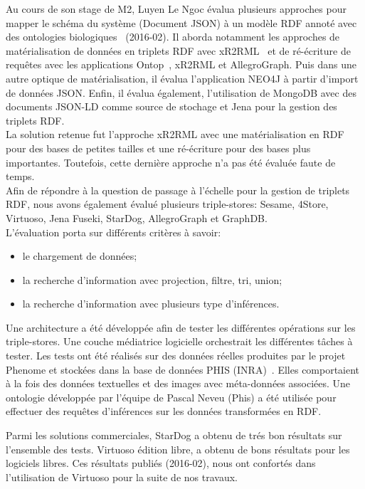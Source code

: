 Au cours de son stage de M2, Luyen Le Ngoc évalua plusieurs approches pour mapper le schéma du système (Document JSON) à un modèle RDF annoté avec des ontologies biologiques~\cite{Luyen:2016} (2016-02). Il aborda notamment les approches de matérialisation de données en triplets RDF avec xR2RML~\cite{Michel2015} et de ré-écriture de requêtes avec les applications Ontop~\cite{rodriguez2015}, xR2RML et AllegroGraph. Puis dans une autre optique de matérialisation, il évalua l'application NEO4J à partir d'import de données JSON. Enfin, il évalua également, l'utilisation de MongoDB avec des documents JSON-LD comme source de stochage et Jena pour la gestion des triplets RDF. \\

La solution retenue fut l'approche xR2RML avec une matérialisation en RDF pour des bases de petites tailles et une ré-écriture pour des bases plus importantes. Toutefois, cette dernière approche n'a pas été évaluée faute de temps. \\

Afin de répondre à la question de passage à l'échelle pour la gestion de triplets RDF, nous avons également évalué plusieurs triple-stores: Sesame, 4Store, Virtuoso, Jena Fuseki, StarDog, AllegroGraph et GraphDB.\\
L'évaluation porta sur différents critères à savoir:
\begin{itemize}
\item le chargement de données; 
\item la recherche d'information avec projection, filtre, tri, union;
\item la recherche d'information avec plusieurs type d'inférences.\\
\end{itemize}


Une architecture a été développée afin de tester les différentes opérations sur les triple-stores. Une couche médiatrice logicielle orchestrait les différentes tâches à tester. Les tests ont été réalisés sur des données réelles produites par le projet Phenome et stockées dans la base de données PHIS (INRA)~\cite{neveu2018}. Elles comportaient à la fois des données textuelles et des images avec méta-données associées.  Une ontologie développée par l'équipe de Pascal Neveu (Phis) a été utilisée pour effectuer des requêtes d'inférences sur les données transformées en RDF.


Parmi les solutions commerciales, StarDog a obtenu de trés bon résultats sur l'ensemble des tests. Virtuoso édition libre, a obtenu de bons résultats pour les logiciels libres. Ces résultats publiés (2016-02), nous ont confortés dans l'utilisation de Virtuoso pour la suite de nos travaux.

